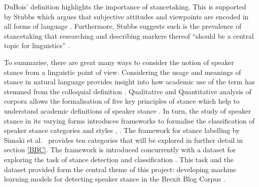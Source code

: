 \documentclass[Dissertation.tex]{subfiles}
\begin{document}
DuBois' \cite{duboisStanceTriangle2007} definition highlights the importance of stancetaking. This is supported by Stubbs  which argues that subjective attitudes and viewpoints are encoded in all forms of language \cite{stubbsMatterProlongedField1986}. Furthermore, Stubbs suggests such is the prevalence of stancetaking that researching and describing markers thereof ``should be  a  central
topic for linguistics'' \cite{stubbsMatterProlongedField1986}.

To summarise, there are great many ways to consider the notion of speaker stance from a linguistic point of view. Considering the usage and meanings of stance in natural language provides insight into how academic use of the term has stemmed from the colloquial definition \cite{barlowUsagebasedModelsLanguage2000}. Qualitative and Quantitative analysis of corpora allows the formalisation of five key principles of stance which help to understand academic definitions of speaker stance \cite{englebretsonStancetakingDiscourseSubjectivity2007}. In turn, the study of speaker stance in its varying forms introduces frameworks to formalise the classification of speaker stance categories and styles \cite{biberStylesStanceEnglish1989}, \cite{simakiAnnotatingSpeakerStance2017}. The framework for stance labelling by Simaki et al.\ \cite{simakiAnnotatingSpeakerStance2017} provides ten categories that will be explored in further detail in section \ref{BBC}. The framework is introduced concurrently with a dataset for exploring the task of stance detection and classification \cite{simakiAnnotatingSpeakerStance2017}. This task and the dataset provided form the central theme of this project: developing machine learning models for detecting speaker stance in the Brexit Blog Corpus \cite{simakiAnnotatingSpeakerStance2017}.
\end{document}
